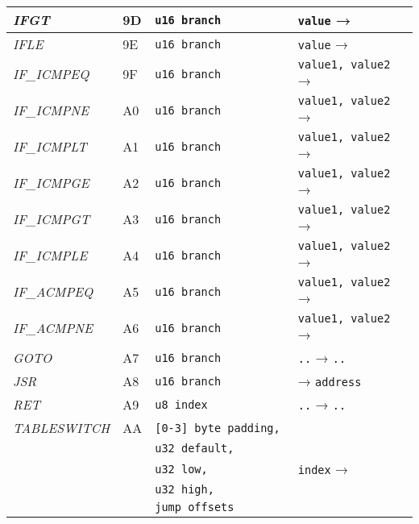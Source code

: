 \begin{center}
\begin{longtable}{ | p{} | p{} | p{} | p{} | }
        \emph{IFGT}
		& 9D & \lstinline|u16 branch| & \lstinline|value| →
		\\ \hline

        \emph{IFLE}
		& 9E & \lstinline|u16 branch| & \lstinline|value| →
		\\ \hline

        \emph{IF\_ICMPEQ}
		& 9F & \lstinline|u16 branch| & \lstinline|value1, value2| →
		\\ \hline

        \emph{IF\_ICMPNE}
		& A0 & \lstinline|u16 branch| & \lstinline|value1, value2| →
		\\ \hline

        \emph{IF\_ICMPLT}
		& A1 & \lstinline|u16 branch| & \lstinline|value1, value2| →
		\\ \hline

        \emph{IF\_ICMPGE}
		& A2 & \lstinline|u16 branch| & \lstinline|value1, value2| →
		\\ \hline

        \emph{IF\_ICMPGT}
		& A3 & \lstinline|u16 branch| & \lstinline|value1, value2| →
		\\ \hline

        \emph{IF\_ICMPLE}
		& A4 & \lstinline|u16 branch| & \lstinline|value1, value2| →
		\\ \hline

        \emph{IF\_ACMPEQ}
		& A5 & \lstinline|u16 branch| & \lstinline|value1, value2| →
		\\ \hline

        \emph{IF\_ACMPNE}
		& A6 & \lstinline|u16 branch| & \lstinline|value1, value2| →
		\\ \hline

        \emph{GOTO}
		& A7 & \lstinline|u16 branch| & \lstinline|..| → \lstinline|..|
		\\ \hline

        \emph{JSR}
		& A8 & \lstinline|u16 branch| & → \lstinline|address|
		\\ \hline

        \emph{RET}
		& A9 & \lstinline|u8 index| & \lstinline|..| → \lstinline|..|
		\\ \hline

        \emph{TABLESWITCH}
		& AA & \lstinline|[0-3] byte padding, | & \\
        & & \lstinline|u32 default, | & \\
        & & \lstinline|u32 low, | & \lstinline|index| → \\
        & & \lstinline|u32 high, | & \\
        & & \lstinline|jump offsets| & 
		\\ \hline


\end{longtable}
\end{center}
